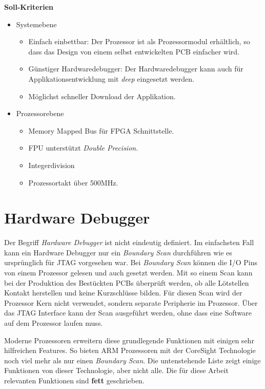 \textbf{Soll-Kriterien}
\begin{itemize}
\item Systemebene
	\begin{itemize}
	\item Einfach einbettbar: Der Prozessor ist als Prozessormodul erhältlich, so dass das Design von einem selbst entwickelten PCB einfacher wird.
	\item Günstiger Hardwaredebugger: Der Hardwaredebugger kann auch für Applikationsentwicklung mit \textit{deep} eingesetzt werden.
	\item Möglichst schneller Download der Applikation.
	\end{itemize}
\item Prozessorebene
	\begin{itemize}
	\item Memory Mapped Bus für FPGA Schnittstelle.
	\item FPU unterstützt \textit{Double Precision}.
	\item Integerdivision
	\item Prozessortakt über 500MHz.
	\end{itemize}
\end{itemize}


\section{Hardware Debugger}
Der Begriff \textit{Hardware Debugger} ist nicht eindeutig definiert.
Im einfachsten Fall kann ein Hardware Debugger nur ein \textit{Boundary Scan} durchführen wie es ursprünglich für JTAG vorgesehen war.
Bei \textit{Boundary Scan} können die I/O Pins von einem Prozessor gelesen und auch gesetzt werden.
Mit so einem Scan kann bei der Produktion des Bestückten PCBs überprüft werden, ob alle Lötstellen Kontakt herstellen und keine Kurzschlüsse bilden.
Für diesen Scan wird der Prozessor Kern nicht verwendet, sondern separate Peripherie im Prozessor.
Über das JTAG Interface kann der Scan ausgeführt werden, ohne dass eine Software auf dem Prozessor laufen muss.

Moderne Prozessoren erweitern diese grundlegende Funktionen mit einigen sehr hilfreichen Features.
So bieten ARM Prozessoren mit der CoreSight Technologie noch viel mehr als nur einen \textit{Boundary Scan}.
Die untenstehende Liste zeigt einige Funktionen von dieser Technologie, aber nicht alle.
Die für diese Arbeit relevanten Funktionen sind \textbf{fett} geschrieben.

